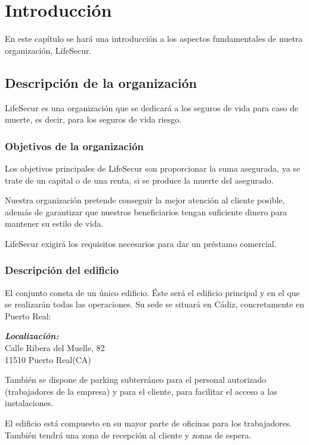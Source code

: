 \documentclass[11pt,bibtotoc,noliststotoc,BCOR0mm]{scrbook}
\begin{document}
\chapter{Introducción} 

En este capítulo se hará una introducción a los aspectos fundamentales de nuetra organización, LifeSecur.

\section{Descripción de la organización}

LifeSecur es una organización que se dedicará a los seguros de vida para caso de muerte, es decir, para los seguros de vida riesgo.

\subsection{Objetivos de la organización}

Los objetivos principales de LifeSecur son proporcionar la suma asegurada, ya se trate de un capital o de una renta, si se produce la muerte del asegurado.

Nuestra organización pretende conseguir la mejor atención al cliente posible, además de garantizar que nuestros beneficiarios tengan suficiente dinero para mantener su estilo de vida.

LifeSecur exigirá los requisitos necesarios para dar un préstamo comercial.

\subsection{Descripción del edificio}

El conjunto consta de un único edificio. Éste será el edificio principal y en el que se realizarán todas las operaciones. Su sede se situará en Cádiz, concretamente en Puerto Real:

\textit{\textbf{Localización:}}\\
Calle Ribera del Muelle, 82\\
11510 Puerto Real(CA)

También se dispone de parking subterráneo para el personal autorizado (trabajadores de la empresa) y para el cliente, para facilitar el acceso a las instalaciones.

El edificio está compuesto en su mayor parte de oficinas para los trabajadores. También tendrá una zona de recepción al cliente y zonas de espera.
\end{document}
